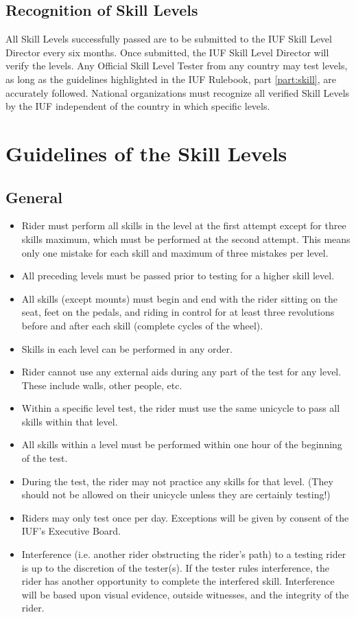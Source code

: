 \subsection{Recognition of Skill Levels}
All Skill Levels successfully passed are to be submitted to the IUF Skill Level Director every six months.
Once submitted, the IUF Skill Level Director will verify the levels.
Any Official Skill Level Tester from any country may test levels, as long as the guidelines highlighted in the IUF Rulebook, part \ref{part:skill}, are accurately followed.
National organizations must recognize all verified Skill Levels by the IUF independent of the country in which specific levels.

\section{Guidelines of the Skill Levels}

\subsection{General}
\begin{itemize}
\item Rider must perform all skills in the level at the first attempt except for three skills maximum, which must be performed at the second attempt.
This means only one mistake for each skill and maximum of three mistakes per
level.
\item All preceding levels must be passed prior to testing for a higher skill level.
\item All skills (except mounts) must begin and end with the rider sitting on the seat, feet on the pedals, and riding in control for at least three revolutions before and after each skill (complete cycles of the wheel).
\item Skills in each level can be performed in any order.
\item Rider cannot use any external aids during any part of the test for any level.
These include walls, other people, etc.
\item Within a specific level test, the rider must use the same unicycle to pass all skills within that level.
\item All skills within a level must be performed within one hour of the beginning of the test.
\item During the test, the rider may not practice any skills for that level.
(They should not be allowed on their unicycle unless they are certainly testing!)
\item Riders may only test once per day.
Exceptions will be given by consent of the IUF's Executive Board.
\item Interference (i.e. another rider obstructing the rider's path) to a testing rider is up to the discretion of the tester(s).
If the tester rules interference, the rider has another opportunity to complete the interfered skill.
Interference will be based upon visual evidence, outside witnesses, and the integrity of the rider.
\end{itemize}

